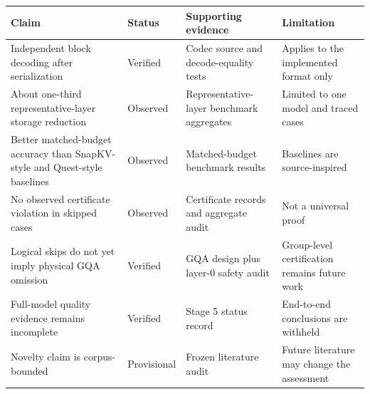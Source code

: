 \begin{threeparttable}
\footnotesize
\setlength{\tabcolsep}{1.5pt}
\begin{tabularx}{\linewidth}{@{}>{\raggedright\arraybackslash}p{1.8cm}>{\raggedright\arraybackslash}p{1.6cm}>{\raggedright\arraybackslash}X>{\raggedright\arraybackslash}X@{}}
\toprule
Claim & Status & Supporting evidence & Limitation \\
\midrule
Independent block decoding after serialization & Verified & Codec source and decode-equality tests & Applies to the implemented format only \\
About one-third representative-layer storage reduction & Observed & Representative-layer benchmark aggregates & Limited to one model and traced cases \\
Better matched-budget accuracy than SnapKV-style and Quest-style baselines & Observed & Matched-budget benchmark results & Baselines are source-inspired \\
No observed certificate violation in skipped cases & Observed & Certificate records and aggregate audit & Not a universal proof \\
Logical skips do not yet imply physical GQA omission & Verified & GQA design plus layer-0 safety audit & Group-level certification remains future work \\
Full-model quality evidence remains incomplete & Verified & Stage 5 status record & End-to-end conclusions are withheld \\
Novelty claim is corpus-bounded & Provisional & Frozen literature audit & Future literature may change the assessment \\
\bottomrule
\end{tabularx}
\end{threeparttable}
